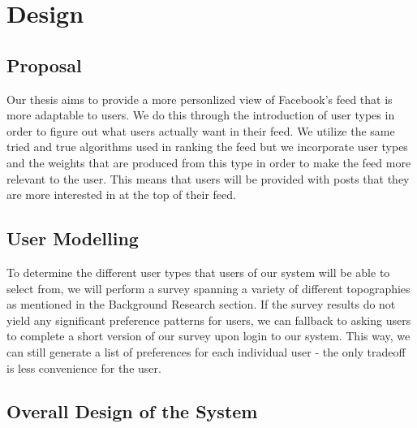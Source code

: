 
\chapter{Design}\label{ch:design}

\section{Proposal}

Our thesis aims to provide a more personlized view of Facebook's feed that is more adaptable to users. We do this through the introduction of user types in order to figure out what users actually want in their feed. We utilize the same tried and true algorithms used in ranking the feed but we incorporate user types and the weights that are produced from this type in order to make the feed more relevant to the user. This means that users will be provided with posts that they are more interested in at the top of their feed. 

\section{User Modelling}

To determine the different user types that users of our system will be able to select from, we will perform a survey spanning a variety of different topographies as mentioned in the Background Research section. If the survey results do not yield any significant preference patterns for users, we can fallback to asking users to complete a short version of our survey upon login to our system. This way, we can still generate a list of preferences for each individual user - the only tradeoff is less convenience for the user.

\section{Overall Design of the System}


